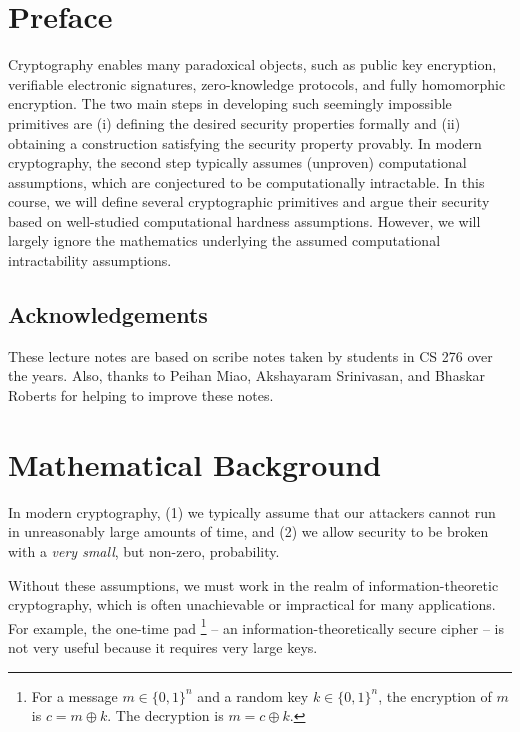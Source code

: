 \documentclass[12pt]{tufte-book}
\begin{document}
\cleardoublepage
\fi
\chapter*{Preface}
Cryptography enables many paradoxical objects, such as public key encryption, verifiable electronic signatures, zero-knowledge protocols, and fully homomorphic encryption.  The two main steps in developing such seemingly impossible primitives are (i) defining the desired security properties formally and (ii) obtaining a construction satisfying the security property provably. In modern cryptography, the second step typically assumes (unproven) computational assumptions, which are conjectured to be computationally intractable. In this course, we will define several cryptographic primitives and argue their security based on well-studied computational hardness assumptions. However, we will largely ignore the mathematics underlying the assumed computational intractability assumptions.

\section*{Acknowledgements}
These lecture notes are based on scribe notes taken by students in CS 276 over the years. Also, thanks to Peihan Miao, Akshayaram Srinivasan, and Bhaskar Roberts for helping to improve these notes.
\newcommand{\sanjam}[1]{{\color{red} Sanjam: #1}}

\newcommand{\bhaskar}[1]{{\color{ForestGreen} Bhaskar: #1}}


\mainmatter
\chapter{Mathematical Background}
\label{sec:mb}

In modern cryptography, (1) we typically assume that our attackers cannot run in unreasonably large amounts of time, and (2) we allow security to be broken with a \emph{very small}, but non-zero, probability.

Without these assumptions, we must work in the realm of information-theoretic cryptography, which is often unachievable or impractical for many applications. For example, the one-time pad
\footnote{For a message $m \in \{0,1\}^n$ and a random key $k \in \{0,1\}^n$, the encryption of $m$ is $c = m \oplus k$. The decryption is $m = c \oplus k$.}
-- an information-theoretically secure cipher -- is not very useful because it requires very large keys.
\end{document}
